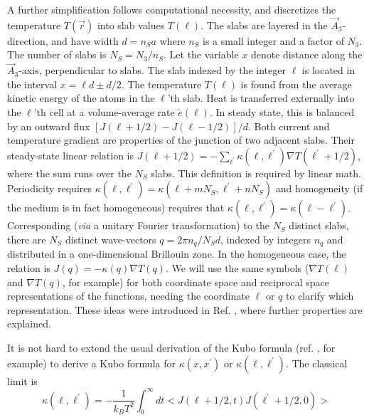 \documentclass[aps,prb,twocolumn,showpacs,superscriptaddress]{revtex4-1}\begin{tiny}\end{tiny}
\begin{document}
A further simplification follows computational necessity, and discretizes the temperature $T(\vec{r})$
into slab values $T(\ell)$.  The slabs are layered
in the $\vec{A}_3$-direction, and have width $d=n_S a$ where $n_S$ is a small
integer and a factor of $N_3$.   The number of slabs is $N_S = N_3/n_S$.
Let the variable $x$ denote distance along
the $\vec{A}_3$-axis, perpendicular to slabs.  The slab indexed by the integer $\ell$
is located in the interval $x=\ell d \pm d/2$.  The temperature $T(\ell)$ is found from
the average kinetic energy of the atoms in the $\ell$'th slab.  Heat is transferred
externally into the $\ell$'th cell at a volume-average rate $\dot{e}(\ell)$.  In steady state,
this is balanced by an outward flux $[J(\ell+1/2)-J(\ell-1/2)]/d$.  Both current and
temperature gradient are properties of the junction of two adjacent slabs.  Their steady-state
linear relation is $J(\ell+1/2)=-\sum_{\ell^\prime}
\kappa(\ell,\ell^\prime)\nabla T(\ell^\prime+1/2)$, where the sum runs over the $N_S$ slabs.  
This definition is required by linear math.
Periodicity requires $\kappa(\ell,\ell^\prime)=\kappa(\ell+mN_S,\ell^\prime+nN_S)$
and homogeneity (if the medium is in fact homogeneous) requires that $\kappa(\ell,\ell^\prime)=
\kappa(\ell-\ell^\prime)$.  Corresponding ({\it via} a unitary Fourier transformation) to the $N_S$ distinct slabs, 
there are $N_S$ distinct wave-vectors $q=2\pi n_q/N_S d$, indexed by integers
$n_q$ and distributed in a one-dimensional Brillouin zone.  In the homogeneous
case, the relation is $J(q)=-\kappa(q)\nabla T(q)$.  We will use the same symbols
($\nabla T(\ell)$ and $\nabla T(q)$, for example) for both coordinate space and
reciprocal space representations of the functions, needing the coordinate
$\ell$ or $q$ to clarify which representation.  These ideas were introduced in
Ref. , where further properties are explained.  

It is not hard to
extend the usual derivation of the Kubo formula (ref. , for example)
to derive a Kubo formula for $\kappa(x,x^\prime)$ or $\kappa(\ell,\ell^\prime)$.  The
classical limit is
%
\begin{equation}
\kappa(\ell,\ell^\prime)=-\frac{1}{k_B T^2}\int_0^\infty dt < J(\ell+1/2,t)J(\ell^\prime+1/2,0)>
\label{eq:Kubo}
\end{equation}
%



  
\end{document}
